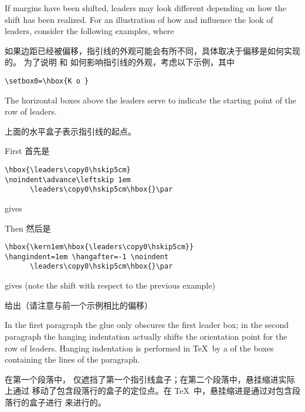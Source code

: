 If margins have been shifted,
leaders may look different
depending on how the shift has been realized.
For an illustration of how  and 
influence the look of leaders, consider the following
examples, where

如果边距已经被偏移，指引线的外观可能会有所不同，具体取决于偏移是如何实现的。
为了说明  和  如何影响指引线的外观，考虑以下示例，其中
\begin{verbatim}
\setbox0=\hbox{K o }
\end{verbatim}
The horizontal boxes above  the leaders
\altt
serve to indicate the starting point of the row of leaders.

上面的水平盒子表示指引线的起点。



First 首先是
\begin{verbatim}
\hbox{\leaders\copy0\hskip5cm}
\noindent\advance\leftskip 1em
      \leaders\copy0\hskip5cm\hbox{}\par
\end{verbatim}
gives
Then 然后是
\begin{verbatim}
\hbox{\kern1em\hbox{\leaders\copy0\hskip5cm}}
\hangindent=1em \hangafter=-1 \noindent
      \leaders\copy0\hskip5cm\hbox{}\par
\end{verbatim}
gives (note the shift with respect to the previous example)

给出（请注意与前一个示例相比的偏移）
In the first paragraph the  glue only obscures
the first leader box; in the second paragraph the hanging
indentation actually shifts the orientation point for the 
row of leaders. Hanging indentation is performed in \TeX\
by a  of the boxes containing the lines
of the paragraph.

在第一个段落中， 仅遮挡了第一个指引线盒子；在第二个段落中，悬挂缩进实际上通过  移动了包含段落行的盒子的定位点。在 \TeX\ 中，悬挂缩进是通过对包含段落行的盒子进行  来进行的。 

